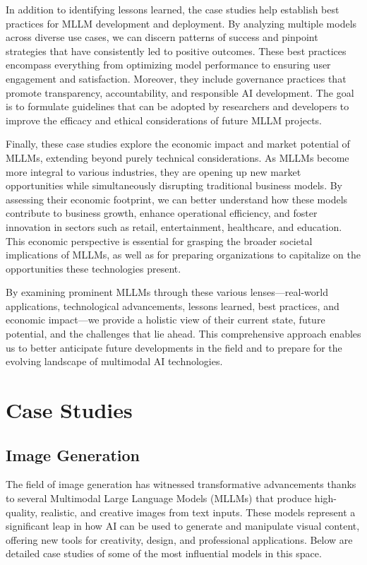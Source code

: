 In addition to identifying lessons learned, the case studies help establish best practices for MLLM development and deployment. By analyzing multiple models across diverse use cases, we can discern patterns of success and pinpoint strategies that have consistently led to positive outcomes. These best practices encompass everything from optimizing model performance to ensuring user engagement and satisfaction. Moreover, they include governance practices that promote transparency, accountability, and responsible AI development. The goal is to formulate guidelines that can be adopted by researchers and developers to improve the efficacy and ethical considerations of future MLLM projects.

Finally, these case studies explore the economic impact and market potential of MLLMs, extending beyond purely technical considerations. As MLLMs become more integral to various industries, they are opening up new market opportunities while simultaneously disrupting traditional business models. By assessing their economic footprint, we can better understand how these models contribute to business growth, enhance operational efficiency, and foster innovation in sectors such as retail, entertainment, healthcare, and education. This economic perspective is essential for grasping the broader societal implications of MLLMs, as well as for preparing organizations to capitalize on the opportunities these technologies present.

By examining prominent MLLMs through these various lenses—real-world applications, technological advancements, lessons learned, best practices, and economic impact—we provide a holistic view of their current state, future potential, and the challenges that lie ahead. This comprehensive approach enables us to better anticipate future developments in the field and to prepare for the evolving landscape of multimodal AI technologies.
\section{Case Studies}

\subsection{Image Generation}

The field of image generation has witnessed transformative advancements thanks to several Multimodal Large Language Models (MLLMs) that produce high-quality, realistic, and creative images from text inputs. These models represent a significant leap in how AI can be used to generate and manipulate visual content, offering new tools for creativity, design, and professional applications. Below are detailed case studies of some of the most influential models in this space.

